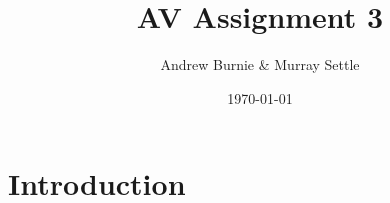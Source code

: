 \documentclass[parskip]{cs4rep}
\begin{document}
\title{AV Assignment 3}

\author{Andrew Burnie & Murray Settle}



\date{\today}

\abstract{
}

\maketitle

\tableofcontents



\chapter{Introduction}



%

\begin{thebibliography}{50}
\end{thebibliography}
\end{document}
